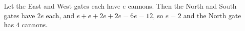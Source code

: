 Let the East and West gates each have $e$ cannons. Then the North and South gates have $2e$ each, and $e+e+2e+2e=6e=12$, so $e=2$ and the North gate has $\boxed{4}$ cannons.
